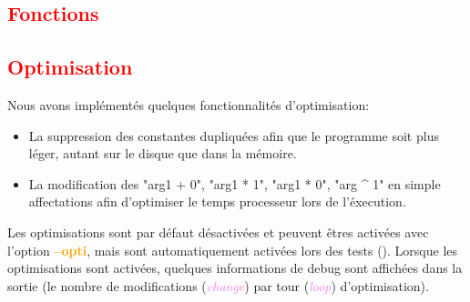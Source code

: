 \documentclass[a4paper]{article}
\let\oldtextbf\textbf
\renewcommand{\textbf}[1]{\textcolor{orange}{\oldtextbf{#1}}}
\let\oldtextit\textit
\renewcommand{\textit}[1]{\textcolor{violet}{\oldtextit{#1}}}
\newcommand{\csection}[1]{\textcolor{red}{\section{#1}}}
\begin{document}
\csection{Fonctions}

\csection{Optimisation}

Nous avons implémentés quelques fonctionnalités d'optimisation:
\begin{itemize}
    \item La suppression des constantes dupliquées afin que le programme soit plus léger, autant sur le disque que dans la mémoire.
    \item La modification des "arg1 + 0", "arg1 * 1", "arg1 * 0", "arg ^ 1" en simple affectations afin d'optimiser le temps processeur lors de l'éxecution.
\end{itemize}

Les optimisations sont par défaut désactivées et peuvent êtres activées avec l'option \textbf{--opti}, mais sont automatiquement activées lors des tests ().
Lorsque les optimisations sont activées, quelques informations de debug sont affichées dans la sortie (le nombre de modifications (\textit{change}) par tour (\textit{loop}) d'optimisation).
\end{document}
